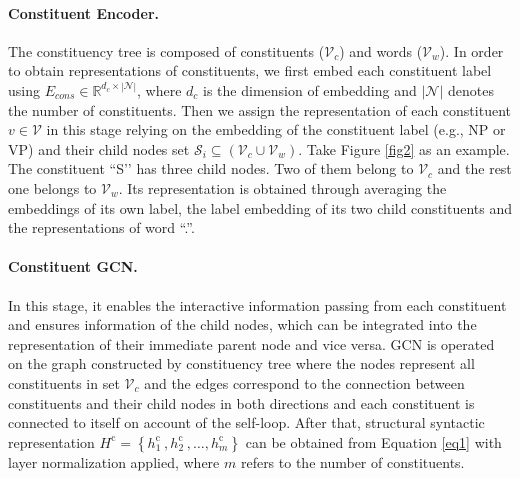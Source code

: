 \documentclass{article}
\begin{document}
\paragraph{Constituent Encoder.}

The constituency tree is composed of constituents ($\mathcal{V}_{c}$) and words ($\mathcal{V}_{w}$). In order to obtain representations of constituents, we first embed each constituent label using $E_{cons} \in \mathbb{R}^{d_c \times |\mathcal{N}|}$, where $d_c$ is the dimension of embedding and $|\mathcal{N}|$ denotes the number of constituents. Then we assign the representation of each constituent $v \in \mathcal{V}$ in this stage relying on the embedding of the constituent label (e.g., NP or VP) and their child nodes set $\mathcal{S}_i \subseteq (\mathcal{V}_{c} \cup \mathcal{V}_{w}) $. Take Figure \ref{fig2} as an example. The constituent ``S’’ has three child nodes. Two of them belong to $\mathcal{V}_{c}$ and the rest one belongs to $\mathcal{V}_{w}$. Its representation is obtained through averaging the embeddings of its own label, the label embedding of its two child constituents and the representations of word ``.''. 

\paragraph{Constituent GCN.}

In this stage, it enables the interactive information passing from each constituent and ensures information of the child nodes, which can be integrated into the representation of their immediate parent node and vice versa. GCN is operated on the graph constructed by constituency tree where the nodes represent all constituents in set $\mathcal{V}_{c}$ and the edges correspond to the connection between constituents and their child nodes in both directions and each constituent is connected to itself on account of the self-loop. After that, structural syntactic representation $H^{\text{c}} = \left\{h_{1}^{\text {c }}, h_{2}^{\text {c }}, \ldots, h_{m}^{\text {c }}\right\}$ can be obtained from Equation \ref{eq1} with layer normalization applied, where $m$ refers to the number of constituents.
\end{document}
